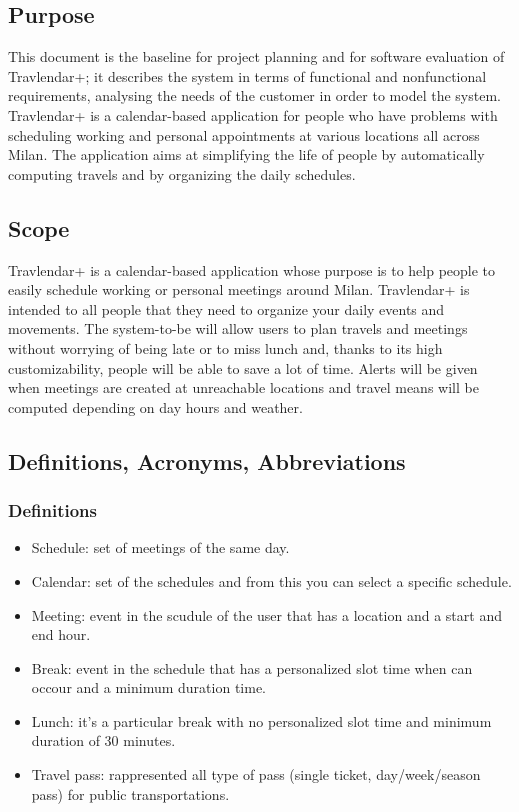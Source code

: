 \subsection{Purpose}
This document is the baseline for project planning and for software evaluation of Travlendar+; it describes the system in terms of functional and nonfunctional requirements, analysing the needs of the customer in order to model the system.\\
Travlendar+ is a calendar-based application for people who have problems with scheduling working and personal appointments at various locations all across Milan. The application aims at simplifying the life of people by automatically computing travels and by organizing the daily schedules.

\subsection{Scope}
Travlendar+ is a calendar-based application whose purpose is to help people to easily schedule working or personal meetings around Milan.
Travlendar+ is intended to all people that they need to organize your daily events and movements. The system-to-be will allow users to plan travels and meetings without worrying of being late or to miss lunch and, thanks to its high customizability, people will be able to save a lot of time. Alerts will be given when meetings are created at unreachable locations and travel means will be computed depending on day hours and weather.

\subsection{Definitions, Acronyms, Abbreviations}

\subsubsection{Definitions}
\renewcommand{\labelitemi}{$-$}
\begin{itemize}
\item
Schedule: set of meetings of the same day.
\item
Calendar: set of the schedules and from this you can select a specific schedule.
\item
Meeting: event in the scudule of the user that has a location and a start and end hour.
\item
Break: event in the schedule that has a personalized slot time when can occour and a minimum duration time.
\item
Lunch: it's a particular break with no personalized slot time and minimum duration of 30 minutes.
\item
Travel pass: rappresented all type of pass (single ticket, day/week/season pass) for public transportations.
\end{itemize}


